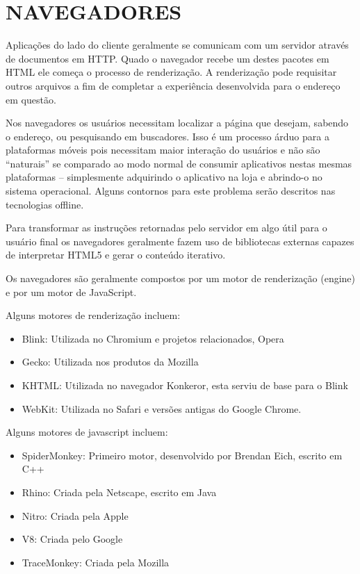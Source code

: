 \documentclass[
12pt,
a4paper,
portuges,
draft
]{report}
\begin{document}

\section{NAVEGADORES}

Aplicações do lado do cliente geralmente se comunicam com um
servidor através de documentos em HTTP. Quado o navegador recebe um
destes pacotes em HTML ele começa o processo de renderização. A
renderização pode requisitar outros arquivos a fim de completar a
experiência desenvolvida para o endereço em questão.

Nos navegadores os usuários necessitam localizar a página que desejam,
sabendo o endereço, ou pesquisando em buscadores. Isso é um processo
árduo para a plataformas móveis pois necessitam maior interação
do usuários e não são “naturais” se comparado ao modo normal
de consumir aplicativos nestas mesmas plataformas – simplesmente
adquirindo o aplicativo na loja e abrindo-o no sistema operacional.
Alguns contornos para este problema serão descritos nas tecnologias
offline.

Para transformar as instruções retornadas pelo servidor em algo útil
para o usuário final os navegadores geralmente fazem uso de bibliotecas
externas capazes de interpretar HTML5 e gerar o conteúdo iterativo.

Os navegadores são geralmente compostos por um motor de renderização (engine)
e por um motor de JavaScript.

Alguns motores de renderização incluem:

\begin{itemize}
    \item Blink: Utilizada no Chromium e projetos relacionados, Opera
    \item Gecko: Utilizada nos produtos da Mozilla
    \item KHTML: Utilizada no navegador Konkeror, esta serviu de base para o Blink
    \item WebKit: Utilizada no Safari e versões antigas do Google Chrome.
\end{itemize}

Alguns motores de javascript incluem:

\begin{itemize}
    \item SpiderMonkey: Primeiro motor, desenvolvido por Brendan Eich, escrito em C++
    \item Rhino: Criada pela Netscape, escrito em Java
    \item Nitro: Criada pela Apple
    \item V8: Criada pelo Google
    \item TraceMonkey: Criada pela Mozilla
\end{itemize}
\end{document}
